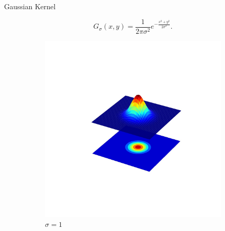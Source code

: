 \begin{frame}{Gaussian Kernel}

    \begin{equation*}
        G_\sigma(x,y) = \frac{1}{2\pi\sigma^2}e^{-\frac{x^2+y^2}{2\sigma^2}}.
    \end{equation*}
    \begin{figure}
        \centering
        \begin{subfigure}[b]{0.3\textwidth}
            \includegraphics[width=\textwidth, trim={0 300 0 300},clip]{./figures/gaussian_2d_1.jpg}
            \caption{$\sigma = 1$}
            \label{sfi:gaussian_2d_1}
        \end{subfigure}
        \begin{subfigure}[b]{0.3\textwidth}

\end{subfigure}
\end{figure}
\end{frame}
